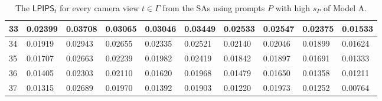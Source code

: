 \begin{table}[H]
{\begin{tabular}{|l|l|l|l|l|l|l|l|l|l|}
        33 & 0.02399 & 0.03708 & 0.03065 & 0.03046 & 0.03449 & 0.02533 & 0.02547 & 0.02375 & 0.01533 \\ \hline
        34 & 0.01919 & 0.02943 & 0.02655 & 0.02335 & 0.02521 & 0.02140 & 0.02046 & 0.01899 & 0.01624 \\ \hline
        35 & 0.01707 & 0.02663 & 0.02239 & 0.01982 & 0.02419 & 0.01842 & 0.01897 & 0.01691 & 0.01333 \\ \hline
        36 & 0.01405 & 0.02303 & 0.02110 & 0.01620 & 0.01968 & 0.01479 & 0.01650 & 0.01358 & 0.01211 \\ \hline
        37 & 0.01315 & 0.02689 & 0.01970 & 0.01392 & 0.01903 & 0.01220 & 0.01973 & 0.01252 & 0.00764 \\ \hline
    \end{tabular}}
	\caption{The $ \mathsf{LPIPS}_t$ for every camera view $t \in \varGamma$ from the SAs using prompts $P$ with high $s_P$ of Model A.}

\end{table}


